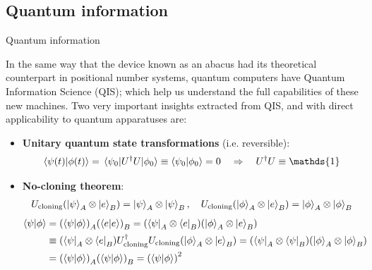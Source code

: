 \documentclass[9pt, handout, aspectratio=169]{beamer}	%
\begin{document}

\subsection{Quantum information}

\begin{frame}{Quantum information}

	In the same way that the device known as an abacus had its theoretical counterpart in positional number systems, quantum computers have Quantum Information Science (QIS); which help us understand the full capabilities of these new machines. Two very important insights extracted from QIS, and with direct applicability to quantum apparatuses are:

	\medskip

	\begin{itemize}
		\item<2-> \textbf{Unitary quantum state transformations} (i.e. reversible):\\
			\begin{gather*}
			  \braket{\psi(t)}{\phi(t)} = \mel{\psi_0}{U^\dagger U}{\phi_0} \equiv
			    \braket{\psi_0}{\phi_0} = 0 \qRa U^\dagger U \equiv \mathds{1}
			\end{gather*}
		\item<3-> \textbf{No-cloning theorem}:\\
			\begin{gather*}
			  U_\text{cloning} \qty(\ket{\psi}_A \otimes \ket{e}_B) =
			    \ket{\psi}_A \otimes \ket{\psi}_B \qc
				U_\text{cloning} \qty(\ket{\phi}_A \otimes \ket{e}_B) =
			    \ket{\phi}_A \otimes \ket{\phi}_B \\
			\end{gather*}
			\vspace{-3em}
			\begin{align*}
				\braket{\psi}{\phi} &=
					\qty(\braket{\psi}{\phi})_A \qty(\braket{e}{e})_B =
					\qty(\bra{\psi}_A\otimes\bra{e}_B) \qty(\ket{\phi}_A\otimes\ket{e}_B) \\
				&\equiv \qty(\bra{\psi}_A\otimes\bra{e}_B)
						U_\text{cloning}^\dagger U_\text{cloning}
						\qty(\ket{\phi}_A\otimes\ket{e}_B) =
					\qty(\bra{\psi}_A\otimes\bra{\psi}_B)
						\qty(\ket{\phi}_A\otimes\ket{\phi}_B) \\
				&= \qty(\braket{\psi}{\phi})_A \qty(\braket{\psi}{\phi})_B =
					\qty(\braket{\psi}{\phi})^2
			\end{align*}
	\end{itemize}

\end{frame}
\end{document}
